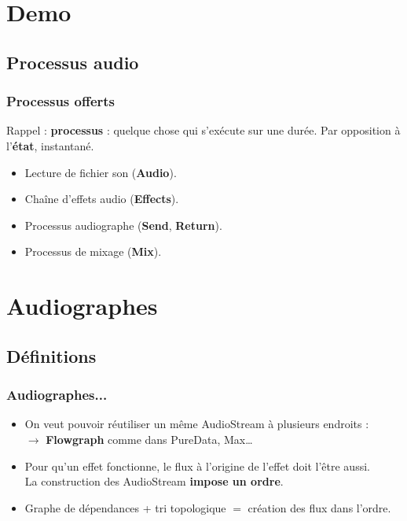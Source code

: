 \documentclass[draft]{beamer}
\begin{document}
\section{Demo}
\subsection{Processus audio}
\begin{frame}	
	\frametitle{Processus offerts}    
	\Large
	Rappel : \textbf{processus} : quelque chose qui s'exécute sur une durée. Par opposition à l'\textbf{état}, instantané.
	\begin{itemize}
		\item Lecture de fichier son (\textbf{Audio}).
		\item Chaîne d'effets audio (\textbf{Effects}).
		\item Processus audiographe (\textbf{Send}, \textbf{Return}).
		\item Processus de mixage (\textbf{Mix}).
	\end{itemize}    
\end{frame}

\section{Audiographes}
\subsection{Définitions}
\begin{frame}
	\frametitle{Audiographes...}    
	\Large
	\begin{itemize}
		\item On veut pouvoir réutiliser un même AudioStream à plusieurs endroits :  \\ $\rightarrow$ \textbf{Flowgraph} comme dans PureData, Max\dots
		\item Pour qu'un effet fonctionne, le flux à l'origine de l'effet doit l'être aussi.~\\
		La construction des AudioStream \textbf{impose un ordre}.
		\item Graphe de dépendances + tri topologique $=$ création des flux dans l'ordre.
	\end{itemize}    
\end{frame}
\end{document}
